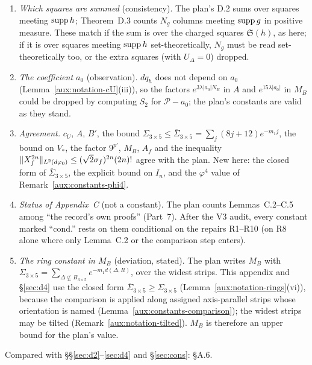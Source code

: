 \begin{enumerate}
stays valid: $S_2$ is monotone (Proposition~\ref{aux:notation-S2}(ii)), $e^{12\lambda|a_0|}\le
e^{15\lambda|a_0|}$, and $8j+10\le8j+12$.  This appendix uses the three columns always.
\item[(D5)] \emph{Which squares are summed} (consistency).  The plan's D.2 sums over squares
meeting $\operatorname{supp} h$; Theorem~D.3 counts $N_g$ columns meeting $\operatorname{supp} g$ in positive measure.  These
match if the sum is over the charged squares $\mathfrak S(h)$, as here; if it is over squares
meeting $\operatorname{supp} h$ set-theoretically, $N_g$ must be read set-theoretically too, or the extra
squares (with $U_\Delta=0$) dropped.
\item[(D6)] \emph{The coefficient $a_0$} (observation).  $dq_h$ does not depend on $a_0$
(Lemma~\ref{aux:notation-cU}(iii)), so the factors $e^{3\lambda|a_0|N_B}$ in $A$ and
$e^{15\lambda|a_0|}$ in $M_B$ could be dropped by computing $S_2$ for $\mathscr P-a_0$; the plan's
constants are valid as they stand.
\item[(D7)] \emph{Agreement.}  $c_U$, $A$, $B'$, the bound $\Sigma_{3\times5}\le\overline\Sigma_{3\times5}=\sum_j(8j+12)e^{-m_1j}$,
the bound on $V_*$, the factor $9^{p'}$, $M_B$, $A_f$ and the inequality
$\|X_f^{2n}\|_{L^2(d\varphi_0)}\le(\sqrt2\sigma_f)^{2n}(2n)!$ agree with the plan.  New here: the
closed form of $\overline\Sigma_{3\times5}$, the explicit bound on $I_n$, and the $\varphi^4$ value of
Remark~\ref{aux:constants-phi4}.
\item[(D8)] \emph{Status of Appendix~C} (not a constant).  The plan counts Lemmas~C.2--C.5 among
``the record's own proofs'' (Part~7).  After the V3 audit, every constant marked ``cond.'' rests
on them conditional on the repairs R1--R10 (on R8 alone where only Lemma~C.2 or the comparison
step enters).
\item[(D9)] \emph{The ring constant in $M_B$} (deviation, stated).  The plan writes $M_B$ with
$\Sigma_{3\times5}=\sum_{\Delta\not\subseteq B_{3\times5}}e^{-m_1d(\Delta,R)}$, over the widest
strips.  This appendix and \S\ref{sec:d4} use the closed form
$\overline\Sigma_{3\times5}\ge\Sigma_{3\times5}$ (Lemma~\ref{aux:notation-rings}(vi)), because the
comparison is applied along assigned axis-parallel strips whose orientation is named
(Lemma~\ref{aux:constants-comparison}); the widest strips may be tilted
(Remark~\ref{aux:notation-tilted}).  $M_B$ is therefore an upper bound for the plan's value.
\end{enumerate}

Compared with \S\S\ref{sec:d2}--\ref{sec:d4} and \S\ref{sec:cons}: \S A.6.


